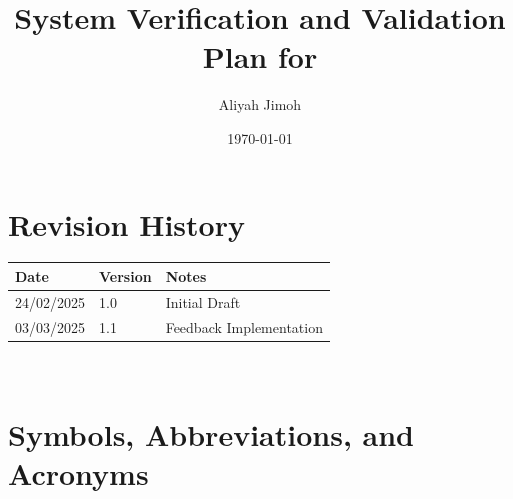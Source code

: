 \documentclass[12pt, titlepage]{article}
\begin{document}
\title{System Verification and Validation Plan for \progname} 
\author{Aliyah Jimoh}
\date{\today}
	
\maketitle


\section*{Revision History}

\begin{tabularx}{\textwidth}{p{3cm}p{2cm}X}
\toprule {\bf Date} & {\bf Version} & {\bf Notes}\\
\midrule
24/02/2025 & 1.0 & Initial Draft\\
03/03/2025 & 1.1 & Feedback Implementation\\
\bottomrule
\end{tabularx}

~\\

\newpage

\tableofcontents

\listoftables

\listoffigures
{}

\newpage

\section{Symbols, Abbreviations, and Acronyms}
\end{document}
